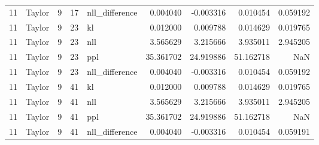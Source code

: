 \begin{tabular}{rlrrlrrrr}
11 & Taylor & 9 & 17 & nll_difference & 0.004040 & -0.003316 & 0.010454 & 0.059192 \\
11 & Taylor & 9 & 23 & kl & 0.012000 & 0.009788 & 0.014629 & 0.019765 \\
11 & Taylor & 9 & 23 & nll & 3.565629 & 3.215666 & 3.935011 & 2.945205 \\
11 & Taylor & 9 & 23 & ppl & 35.361702 & 24.919886 & 51.162718 & NaN \\
11 & Taylor & 9 & 23 & nll_difference & 0.004040 & -0.003316 & 0.010454 & 0.059192 \\
11 & Taylor & 9 & 41 & kl & 0.012000 & 0.009788 & 0.014629 & 0.019765 \\
11 & Taylor & 9 & 41 & nll & 3.565629 & 3.215666 & 3.935011 & 2.945205 \\
11 & Taylor & 9 & 41 & ppl & 35.361702 & 24.919886 & 51.162718 & NaN \\
11 & Taylor & 9 & 41 & nll_difference & 0.004040 & -0.003316 & 0.010454 & 0.059191 \\
\bottomrule
\end{tabular}
